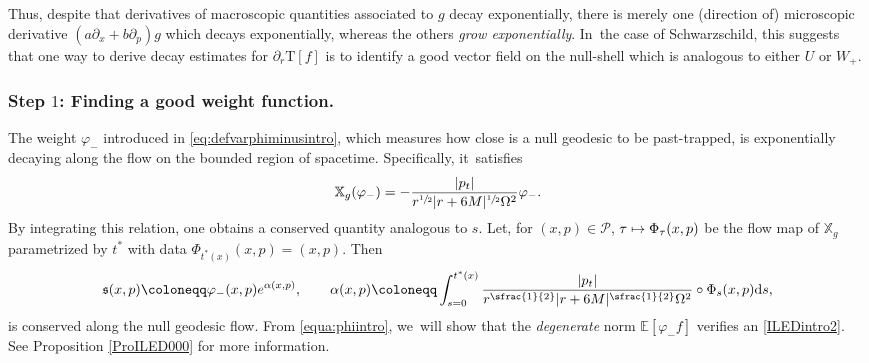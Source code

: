 \documentclass[10pt]{amsart}
\newcommand\mto{\mathchoice{\longmapsto}{\mapsto}{\mapsto}{\mapsto}}
\theoremstyle{plain}
\theoremstyle{definition}
\newcommand\T{{\mathbb{X}}}
\newcommand\dr{{\mathrm{d}}}
\begin{document}
Thus, despite that derivatives of macroscopic quantities associated to $g$ decay exponentially, there is merely one (direction of) microscopic derivative $(a\partial_x+b\partial_p)g$ which decays exponentially, whereas the others \emph{grow exponentially}. In~the case of Schwarzschild, this suggests that one way to derive decay estimates for $\partial_r \mathrm{T}[f]$ is to identify a good vector field on the null-shell which is analogous to either $U$ or $W_+$.

\subsubsection{Step $1$: Finding a good weight function.} The weight $\varphi_-$ introduced in \eqref{eq:defvarphiminusintro}, which measures how close is a null geodesic to be past-trapped, is exponentially decaying along the flow on the bounded region of spacetime. Specifically, it~satisfies
\begin{equation}\label{equa:phiintro}
\T_g (\varphi_-)=-\frac{|p_t|}{r^{\sfrac{1}{2}} |r+6M|^{\sfrac{1}{2}}\Omega^2} \varphi_-.
\end{equation}
By integrating this relation, one obtains a conserved quantity analogous to $s$. Let, for $(x,p) \in \mathcal{P}$, $\tau \mto \Phi_{\tau}(x,p)$ be the flow map of $\T_g$ parametrized by $t^*$ with data $\Phi_{t^*(x)}(x,p)=(x,p)$. Then
\[
\mathfrak{s}(x,p)\coloneqq \varphi_- (x,p) e^{\alpha(x,p)}, \qquad \alpha(x,p)\coloneqq \int_{s=0}^{t^*(x)} \frac{|p_t|}{r^{\sfrac{1}{2}} |r+6M|^{\sfrac{1}{2}}\Omega^2} \circ \Phi_{s}(x,p) \dr s,
\]
is conserved along the null geodesic flow. From \eqref{equa:phiintro}, we~will show that the \emph{degenerate} norm $\mathbb{E}[\varphi_- f]$ verifies an \eqref{ILEDintro2}. See Proposition \ref{ProILED000} for more information.
\end{document}
